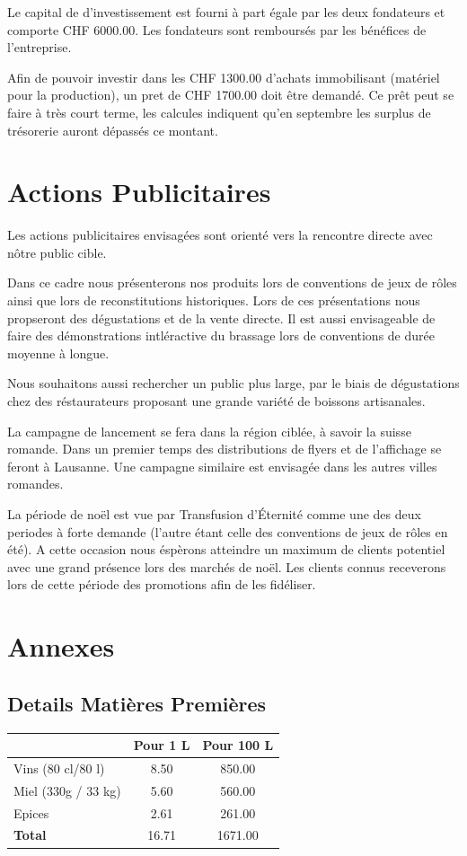 \documentclass[10pt,a4paper]{article}
\newcommand{\tde}{Transfusion d'Éternité}
\begin{document}
Le capital de d'investissement est fourni à part égale par les deux fondateurs et comporte CHF 6000.00.
Les fondateurs sont remboursés par les bénéfices de l'entreprise.

Afin de pouvoir investir dans les CHF 1300.00 d'achats immobilisant (matériel pour la production), un pret de CHF 1700.00 doit être demandé.
Ce prêt peut se faire à très court terme, les calcules indiquent qu'en septembre les surplus de trésorerie auront dépassés ce montant.


\section{Actions Publicitaires}
Les actions publicitaires envisagées sont orienté vers la rencontre directe avec nôtre public cible.

Dans ce cadre nous présenterons nos produits lors de conventions de jeux de rôles ainsi que lors de reconstitutions historiques.
Lors de ces présentations nous propseront des dégustations et de la vente directe.
Il est aussi envisageable de faire des démonstrations intléractive du brassage lors de conventions de durée moyenne à longue.

Nous souhaitons aussi rechercher un public plus large, par le biais de dégustations chez des réstaurateurs proposant une grande variété de boissons artisanales.

La campagne de lancement se fera dans la région ciblée, à savoir la suisse romande.
Dans un premier temps des distributions de flyers et de l'affichage se feront à Lausanne.
Une campagne similaire est envisagée dans les autres villes romandes.

La période de noël est vue par \tde{} comme une des deux periodes à forte demande (l'autre étant celle des conventions de jeux de rôles en été).
A cette occasion nous éspèrons atteindre un maximum de clients potentiel avec une grand présence lors des marchés de noël.
Les clients connus receverons lors de cette période des promotions afin de les fidéliser.
\section{Annexes}
\subsection{Details Matières Premières}
\begin{tabular}{|l|S[table-format=4.2]|S[table-format=4.2]|}
\hline
& \textbf{Pour 1 L} & \textbf{Pour 100 L} \\\hline
Vins (80 cl/80 l) & 8.50 & 850.00 \\
Miel (330g / 33 kg) & 5.60 & 560.00 \\
Epices & 2.61 & 261.00 \\\hline
\textbf{Total} & 16.71 & 1671.00\\\hline
\end{tabular}
\end{document}
